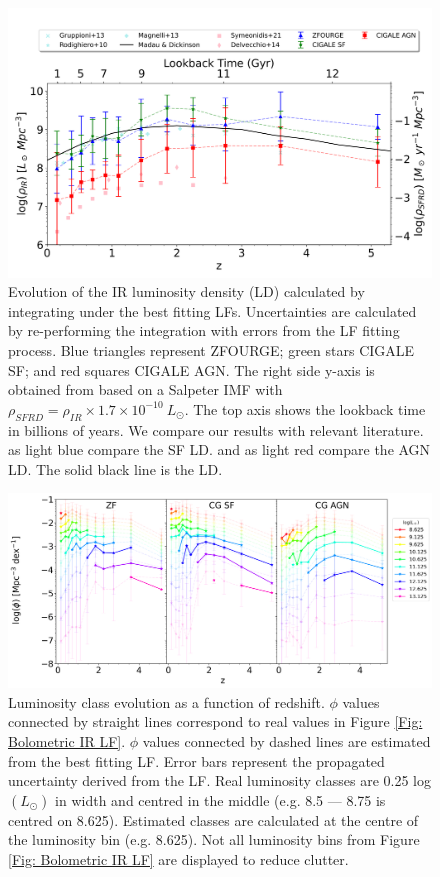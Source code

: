 \begin{figure}[t!]
    \centering
    \includegraphics[width=\textwidth]{Figures/SFRD.png}
    \caption{Evolution of the IR luminosity density (LD) calculated by integrating under the best fitting LFs. Uncertainties are calculated by re-performing the integration with errors from the LF fitting process. Blue triangles represent ZFOURGE; green stars CIGALE SF; and red squares CIGALE AGN. The right side y-axis is obtained from \cite{kennicutt_global_1998} based on a Salpeter IMF with $\rho_{SFRD} = \rho_{IR} \times 1.7\times10^{-10} \ L_{\odot}$. The top axis shows the lookback time in billions of years. We compare our results with relevant literature. \cite{gruppioni_herschel_2013, rodighiero_mid-_2010, magnelli_deepest_2013} as light blue compare the SF LD. \cite{symeonidis_agn_2021} and \cite{delvecchio_tracing_2014} as light red compare the AGN LD. The solid black line is the \cite{madau_cosmic_2014} LD.}
    \label{Fig: SFRD}
\end{figure}

\begin{figure}
    \centering
    \includegraphics[width=\textwidth]{Figures/Class_Evo.png}
    \caption{Luminosity class evolution as a function of redshift. $\phi$ values connected by straight lines correspond to real values in Figure \ref{Fig: Bolometric IR LF}. $\phi$ values connected by dashed lines are estimated from the best fitting LF. Error bars represent the propagated uncertainty derived from the LF. Real luminosity classes are 0.25 log$(L_{\odot})$ in width and centred in the middle (e.g. 8.5 --- 8.75 is centred on 8.625). Estimated classes are calculated at the centre of the luminosity bin (e.g. 8.625). Not all luminosity bins from Figure \ref{Fig: Bolometric IR LF} are displayed to reduce clutter.}
    \label{Fig: Class Evo}
\end{figure}

